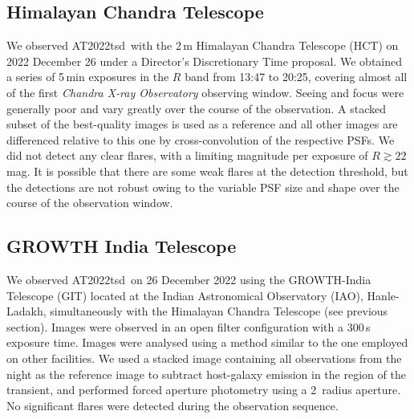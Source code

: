 \documentclass{nature_plusfigure}
\newcommand{\at}{AT2022tsd}
\begin{document}
\begin{methods}
\subsection{Himalayan Chandra Telescope}
\label{sec:HCT}

We observed \at\ with the 2\,m Himalayan Chandra Telescope (HCT) on 2022 December 26 under a Director's Discretionary Time proposal. We obtained a series of 5\,min exposures in the $R$ band from 13:47 to 20:25, covering almost all of the first {\it Chandra X-ray Observatory} observing window.  Seeing and focus were generally poor and vary greatly over the course of the observation.  A stacked subset of the best-quality images is used as a reference and all other images are differenced relative to this one by cross-convolution of the respective PSFs.   We did not detect any clear flares, with a limiting magnitude per exposure of $R\gtrsim22\,$mag. It is possible that there are some weak flares at the detection threshold, but the detections are not robust owing to the variable PSF size and shape over the course of the observation window.

\subsection{GROWTH India Telescope}
\label{sec:GIT}

We observed \at\ on 26 December 2022 using the GROWTH-India Telescope (GIT\cite{Kumar2022}) located at the Indian Astronomical Observatory (IAO), Hanle-Ladakh, simultaneously with the Himalayan Chandra Telescope (see previous section). Images were observed in an open filter configuration with a 300\,s exposure time. Images were analysed using a method similar to the one employed on other facilities.  We used a stacked image containing all observations from the night as the reference image to subtract host-galaxy emission in the region of the transient, and performed forced aperture photometry using a 2\arcsec\ radius aperture.  No significant flares were detected during the observation sequence.


\end{methods}
\end{document}
